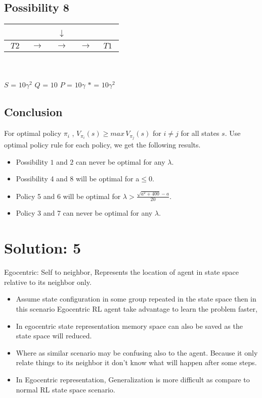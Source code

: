 \documentclass{article}
\begin{document}
\subsection{Possibility 8}

\begin{tabular}{|c|c|c|c|c|}
\hline 
~~~ & ~~~ & ~$\downarrow$~ & ~~~ & ~~~\tabularnewline
\hline 
\hline 
$T2$ & $\begin{array}{c}
\rightarrow\end{array}$ & $\rightarrow$ & $\rightarrow$ & $T1$\tabularnewline
\hline 
\end{tabular}\\
\\
\space\space
$S$ = $10\gamma^{2}$
\space\space
 $Q$ = $10$
\space\space
 $P$ = $10\gamma$
\space\space
 $*$ = $10\gamma^{2}$

\subsection*{Conclusion}

For optimal policy $\pi_{i}$ , $V_{\pi_{i}}(s)\geq max\,V_{\pi_{j}}(s)$
for $i\neq j$ for all states $s$. Use optimal policy rule for each
policy, we get the following results.
\begin{itemize}
\item Possibility $1$ and $2$ can never be optimal for any $\lambda$.
\item Possibility 4 and 8 will be optimal for a$\leq 0$.
\item  Policy 5 and 6  will be optimal for $\lambda >  \frac{\sqrt{a^2 + 400}-a}{20}.$
\item Policy 3 and 7 can never be optimal for any $\lambda$.	
\end{itemize}

\section{Solution: 5} 
Egocentric: Self to neighbor, Represents the location of agent in state space relative to its neighbor only.

\begin{itemize}
\item Assume state configuration in some group repeated in the state space then in this scenario Egocentric RL agent take advantage to learn the problem faster,
\item In egocentric state representation memory space can also be saved as the state space will reduced.
\item Where as similar scenario may be confusing also to the agent. Because it only relate things to its neighbor it don't know what will happen after some steps.
\item In Egocentric representation, Generalization is more difficult as compare to normal RL state space scenario. 
\end{itemize}
\end{document}
